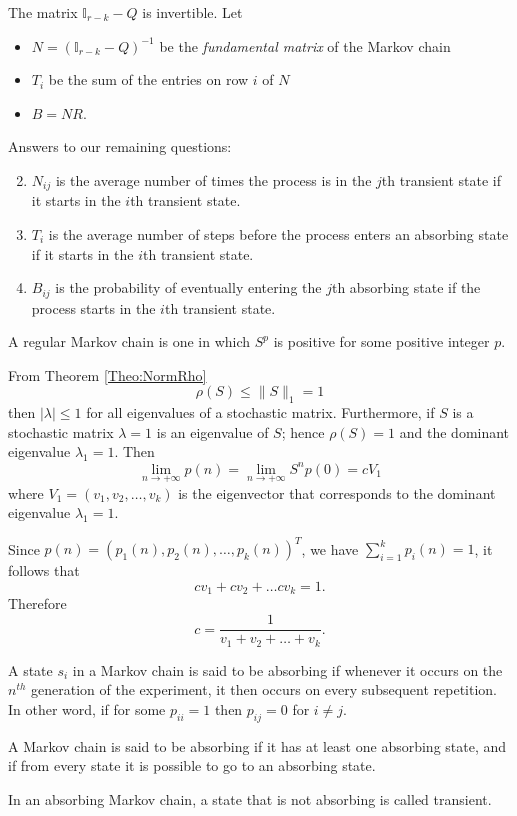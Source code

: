 The matrix $\mathbb{I}_{r-k}-Q$ is invertible. Let
\begin{itemize}
\item $N=(\mathbb{I}_{r-k}-Q)^{-1}$ be the \emph{fundamental matrix} of the Markov chain
\item $T_i$ be the sum of the entries on row $i$ of $N$
\item $B=NR$.
\end{itemize}
\vskip0.5cm
Answers to our remaining questions:
\begin{enumerate}
\setcounter{enumi}{1}
\item $N_{ij}$ is the average number of times the process is in the $j$th transient state if it starts in the $i$th transient state.
\item $T_i$ is the average number of steps before the process enters an absorbing state if it starts in the $i$th transient state.
\item $B_{ij}$ is the probability of eventually entering the $j$th absorbing state if the process starts in the $i$th transient state.
\end{enumerate}











\begin{definition}
A regular Markov chain is one in which $S^p$ is positive for some positive integer $p$.
\end{definition}

From Theorem \ref{Theo:NormRho}
$$\rho(S)\leq \| S\| _1 =1$$
then $|\lambda|\leq 1$ for all eigenvalues of a stochastic matrix. Furthermore, if $S$ is a stochastic matrix $\lambda =1$ is an eigenvalue of $S$; hence $\rho(S)=1$ and the dominant eigenvalue $\lambda _1 =1$. Then
$$\lim_{n\rightarrow +\infty}p(n)=\lim_{n\rightarrow +\infty}S^np(0)=cV_1$$
where $V_1=(v_1,v_2,\dots ,v_k)$ is the eigenvector that corresponds to the dominant eigenvalue $\lambda _1 =1$.

Since $p(n)=(p_1(n),p_2(n),\dots , p_k(n))^T$, we have $\sum_{i=1}^k p_i(n)=1$, it follows that
$$cv_1+cv_2+\dots cv_k=1.$$
Therefore
$$c=\frac{1}{v_1+v_2+\dots+v_k}.$$


\begin{definition}
A state $s_i$ in a Markov chain is said to be absorbing if whenever it occurs on the $n^{th}$ generation of the experiment, it then occurs on every subsequent repetition. In other word, if for some $p_{ii}=1$ then $p_{ij}=0$ for $i\not =j$.
\end{definition}

\begin{definition}
A Markov chain is said to be absorbing if it has at least one absorbing state, and if from every state it is possible to go to an absorbing state.
\end{definition}

In an absorbing Markov chain, a state that is not absorbing is called transient.
